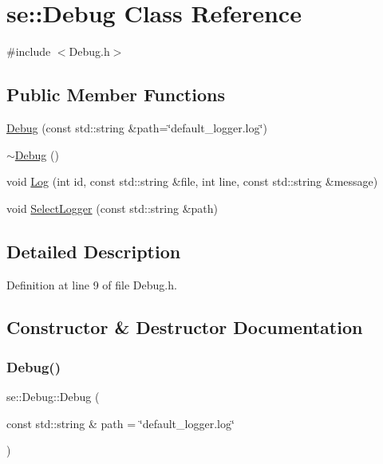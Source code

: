 \hypertarget{classse_1_1_debug}{}\section{se\+:\+:Debug Class Reference}
\label{classse_1_1_debug}


{\ttfamily \#include $<$Debug.\+h$>$}

\subsection*{Public Member Functions}
\begin{DoxyCompactItemize}
\item 
\mbox{\hyperlink{classse_1_1_debug_a1292de4f720caa545023e0b4a4735eef}{Debug}} (const std\+::string \&path=\char`\"{}default\+\_\+logger.\+log\char`\"{})
\item 
\mbox{\hyperlink{classse_1_1_debug_a2ff6371c83b2a8918b15907bd1491ac9}{$\sim$\+Debug}} ()
\item 
void \mbox{\hyperlink{classse_1_1_debug_a682e9ff37514ccccfd063a1aff942e2d}{Log}} (int id, const std\+::string \&file, int line, const std\+::string \&message)
\item 
void \mbox{\hyperlink{classse_1_1_debug_ab97d44dca8606c2be2cb709f7e82be09}{Select\+Logger}} (const std\+::string \&path)
\end{DoxyCompactItemize}


\subsection{Detailed Description}


Definition at line 9 of file Debug.\+h.



\subsection{Constructor \& Destructor Documentation}
\mbox{\label{classse_1_1_debug_a1292de4f720caa545023e0b4a4735eef}} 
\subsubsection{\texorpdfstring{Debug()}{Debug()}}
{\footnotesize\ttfamily se\+::\+Debug\+::\+Debug (\begin{DoxyParamCaption}\item[{const std\+::string \&}]{path = {\ttfamily \char`\"{}default\+\_\+logger.log\char`\"{}} }\end{DoxyParamCaption})}

